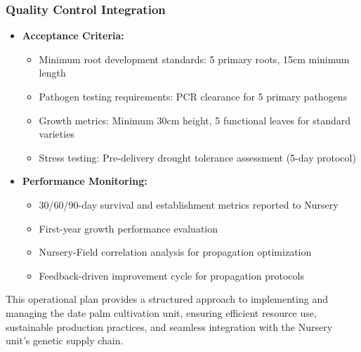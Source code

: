 \subsubsection{Quality Control Integration}
\begin{itemize}
    \item \textbf{Acceptance Criteria:}
    \begin{itemize}
        \item Minimum root development standards: 5 primary roots, 15cm minimum length
        \item Pathogen testing requirements: PCR clearance for 5 primary pathogens
        \item Growth metrics: Minimum 30cm height, 5 functional leaves for standard varieties
        \item Stress testing: Pre-delivery drought tolerance assessment (5-day protocol)
    \end{itemize}
    \item \textbf{Performance Monitoring:}
    \begin{itemize}
        \item 30/60/90-day survival and establishment metrics reported to Nursery
        \item First-year growth performance evaluation
        \item Nursery-Field correlation analysis for propagation optimization
        \item Feedback-driven improvement cycle for propagation protocols
    \end{itemize}
\end{itemize}

This operational plan provides a structured approach to implementing and managing the date palm cultivation unit, ensuring efficient resource use, sustainable production practices, and seamless integration with the Nursery unit's genetic supply chain.
